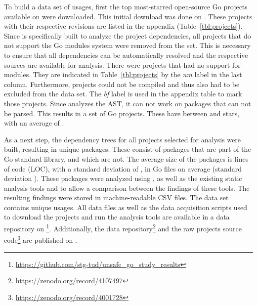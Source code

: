 To build a data set of \unsafe{} usages, first the top \projsTotal{} most-starred open-source Go projects available on
\github{} were downloaded.
This initial download was done on .
These \projsTotal{} projects with their respective revisions are listed in the appendix (Table~\ref{tbl:projects}).
Since \toolGeiger{} is specifically built to analyze the project dependencies, all projects that do not support the Go
modules system were removed from the set.
This is necessary to ensure that all dependencies can be automatically resolved and the respective sources are available
for analysis.
There were \projsWithoutModules{} projects that had no support for modules.
They are indicated in Table~\ref{tbl:projects} by the \textit{nm} label in the last column.
Furthermore, \projsNotCompiled{} projects could not be compiled and thus also had to be excluded from the data set.
The \textit{bf} label is used in the appendix table to mark those projects.
Since \toolGeiger{} analyzes the \acrshort{AST}, it can not work on packages that can not be parsed.
This results in a set of \projsAnalyzed{} Go projects.
These have between  and  stars, with an average of .

As a next step, the dependency trees for all projects selected for analysis were built, resulting in \packagesAnalyzed{}
unique packages.
These consist of  packages that are part of the Go standard library, and  which are not.
The average size of the packages is  lines of code (\acrshort{LOC}), with a standard deviation of
, in  Go files on average (standard deviation ).
These packages were analyzed using \toolGeiger{}, as well as the existing static analysis tools \toolVet{} and
\toolGosec{} to allow a comparison between the findings of these tools.
The resulting findings were stored in machine-readable \acrshort{CSV} files.
The data set contains \uniqueUnsafeFindings{} unique \unsafe{} usages.
All data files as well as the data acquisition scripts used to download the projects and run the analysis tools are
available in a data repository on \github{}\footnote{\url{https://github.com/stg-tud/unsafe_go_study_results}}.
Additionally, the data repository\footnote{\url{https://zenodo.org/record/4107497} } and the raw projects source
code\footnote{\url{https://zenodo.org/record/4001728}} are published on \zenodo{}.



